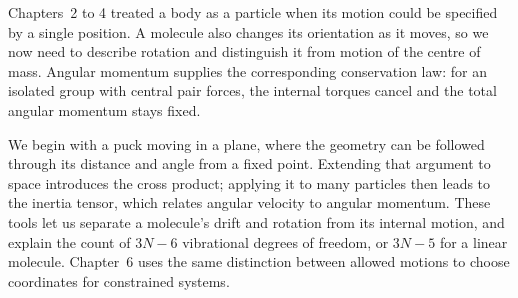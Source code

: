 Chapters~2 to 4 treated a body as a particle when its motion could be
specified by a single position. A molecule also changes its orientation
as it moves, so we now need to describe rotation and distinguish it from
motion of the centre of mass. Angular momentum supplies the corresponding
conservation law: for an isolated group with central pair forces, the
internal torques cancel and the total angular momentum stays fixed.

We begin with a puck moving in a plane, where the geometry can be followed
through its distance and angle from a fixed point. Extending that argument
to space introduces the cross product; applying it to many particles then
leads to the inertia tensor, which relates angular velocity to angular
momentum. These tools let us separate a molecule's drift and rotation
from its internal motion, and explain the count of $3N - 6$ vibrational
degrees of freedom, or $3N - 5$ for a linear molecule. Chapter~6 uses the
same distinction between allowed motions to choose coordinates for
constrained systems.
